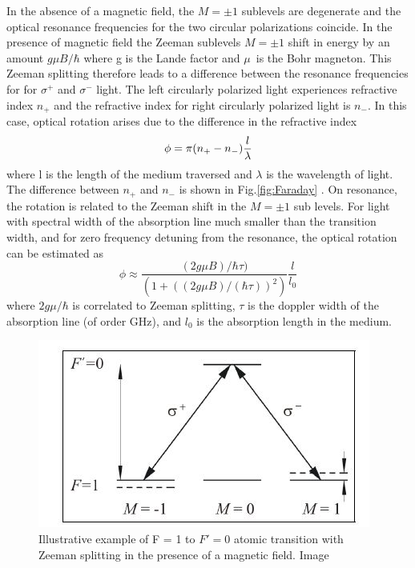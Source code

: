 \begin{itemize}
\begin{itemize}
 In the absence of a magnetic field, the $M=\pm 1$ sublevels are
degenerate and the optical resonance frequencies for  the two circular
polarizations coincide. 
 In the presence of magnetic field the Zeeman sublevels $M=\pm 1$ shift in energy  by an amount $g\mu B/\hbar$ where g is the Lande factor and $\mu$~is the Bohr magneton. This Zeeman splitting therefore leads to a difference between the  resonance frequencies for for $\sigma^+$ and
$\sigma^-$ light. The left circularly polarized light experiences refractive index $n_+$ and the refractive index for right circularly polarized light is $n_-$. In this case, optical rotation arises due to the difference in the refractive index 
\begin{equation}
\label{eq:emc}
\phi = \pi(n_+-n_{-})\frac{l}{\lambda} \\
\end{equation}
where l is the length of the medium traversed and $\lambda$ is the wavelength of light. The difference between $n_+$ and $n_-$ is shown in  Fig.\ref{fig:Faraday} . On resonance, the rotation is related to the Zeeman shift in the $M=\pm 1$ sub levels. For light with spectral
width of the absorption line much smaller than the transition width, and for zero
frequency detuning from the resonance, the optical rotation can be estimated as
\begin{equation}
\phi \approx \frac{(2g\mu B)/ \hbar\tau)}{(1+((2g\mu B)/(\hbar\tau))^2 )}\frac{l}{l_0}
\end{equation}
where $2g\mu/\hbar$ is correlated to Zeeman splitting, $\tau$ is the doppler width of the
absorption line (of order GHz), and $l_0$ is the absorption length in the medium. 
\begin{figure}[h]
\centering
\includegraphics[width=0.75\linewidth]{figures/optical_rotation}
\caption{Illustrative example of F = 1 to $F' = 0$ atomic transition with Zeeman
splitting in the presence of a magnetic field. Image\cite{Budker2002JU2}\label{fig:Zeemansplitting}}
\end{figure}

\end{itemize}
\end{itemize}
